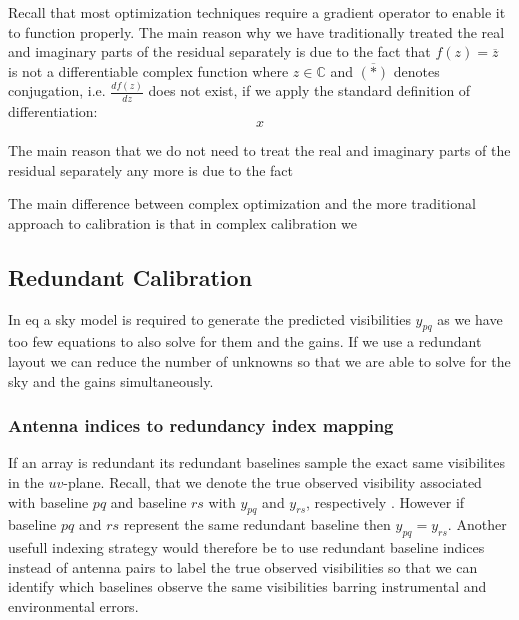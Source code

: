 \documentclass[a4paper,fleqn,usenatbib]{mnras}
\newcommand{\bz}{\bmath{z}}
\newcommand{\conj}[1]{\overline{#1}}
\begin{document}
Recall that most optimization techniques require a gradient operator to enable it to function properly. The main reason why we have traditionally treated 
the real and imaginary parts of the residual separately is due to the fact that $f(z) = \conj{z}$ is not a differentiable complex function where $z\in\mathbb{C}$ and $\conj{(*)}$ denotes conjugation, i.e. $\frac{df(z)}{dz}$
does not exist, if we apply the standard definition of differentiation:
\begin{equation}
x
\end{equation}



The main reason that we do not need to treat the real and imaginary parts of the residual separately any more is due to the 
fact 


 

The main difference between complex optimization and the more traditional
approach to calibration is that in complex calibration we 

\subsection{Redundant Calibration}
In eq a sky model is required to generate the predicted visibilities $y_{pq}$ as we have too few equations to also solve for them and the gains. If we use a redundant layout
we can reduce the number of unknowns so that we are able to solve for the sky and the gains simultaneously.

\subsubsection{Antenna indices to redundancy index mapping}
If an array is redundant its redundant baselines sample the exact same visibilites in the $uv$-plane. Recall, that we denote the true observed visibility associated with baseline $pq$ and 
baseline $rs$ with $y_{pq}$ and $y_{rs}$, respectively . However if baseline $pq$ and $rs$ represent the same redundant baseline then $y_{pq} = y_{rs}$. Another
usefull indexing strategy would therefore be to use redundant baseline indices instead of antenna pairs to label the true observed visibilities so that we can identify 
which baselines observe the same visibilities barring instrumental and environmental errors.
\end{document}
